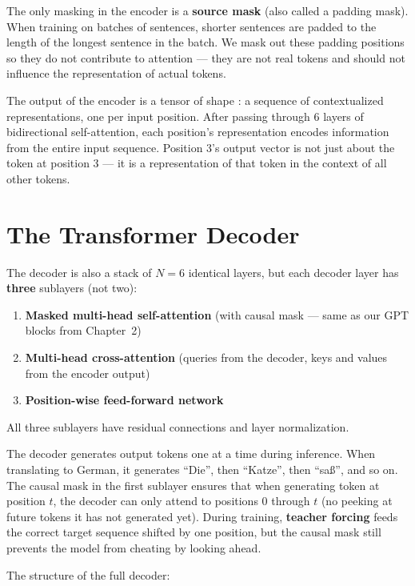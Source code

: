 The only masking in the encoder is a \textbf{source mask} (also called a padding mask). When training on batches of sentences, shorter sentences are padded to the length of the longest sentence in the batch. We mask out these padding positions so they do not contribute to attention --- they are not real tokens and should not influence the representation of actual tokens.

The output of the encoder is a tensor of shape : a sequence of contextualized representations, one per input position. After passing through 6 layers of bidirectional self-attention, each position's representation encodes information from the entire input sequence. Position 3's output vector is not just about the token at position 3 --- it is a representation of that token in the context of all other tokens.

\section{The Transformer Decoder}

The decoder is also a stack of $N = 6$ identical layers, but each decoder layer has \textbf{three} sublayers (not two):

\begin{enumerate}
  \item \textbf{Masked multi-head self-attention} (with causal mask --- same as our GPT blocks from Chapter~2)
  \item \textbf{Multi-head cross-attention} (queries from the decoder, keys and values from the encoder output)
  \item \textbf{Position-wise feed-forward network}
\end{enumerate}

All three sublayers have residual connections and layer normalization.

The decoder generates output tokens one at a time during inference. When translating to German, it generates ``Die'', then ``Katze'', then ``sa\ss{}'', and so on. The causal mask in the first sublayer ensures that when generating token at position $t$, the decoder can only attend to positions 0 through $t$ (no peeking at future tokens it has not generated yet). During training, \textbf{teacher forcing} feeds the correct target sequence shifted by one position, but the causal mask still prevents the model from cheating by looking ahead.

The structure of the full decoder:

